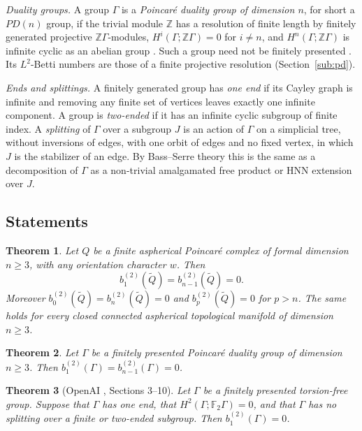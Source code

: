 \documentclass[11pt,a4paper]{article}
\newtheorem{theoremx}{Theorem}
\theoremstyle{definition}
\theoremstyle{remark}
\newcommand{\Z}{\mathbb{Z}}
\newcommand{\F}{\mathbb{F}}
\newcommand{\Gam}{\Gamma}
\newcommand{\bt}[1]{b^{(2)}_{#1}}
\begin{document}
\emph{Duality groups.} A group $\Gam$ is a \emph{Poincar\'e duality group of dimension
$n$}, for short a $PD(n)$ group, if the trivial module $\Z$ has a resolution of
finite length by finitely generated projective $\Z\Gam$-modules, $H^i(\Gam;\Z\Gam)=0$ for
$i\ne n$, and $H^n(\Gam;\Z\Gam)$ is infinite cyclic as an abelian group \cite{Da}. Such
a group need not be finitely presented \cite[Theorem~7.15]{Da}. Its $L^2$-Betti
numbers are those of a finite projective resolution (Section~\ref{sub:pd}).

\emph{Ends and splittings.} A finitely generated group has \emph{one end} if its
Cayley graph is infinite and removing any finite set of vertices leaves exactly one
infinite component. A group is \emph{two-ended} if it has an infinite cyclic
subgroup of finite index. A \emph{splitting} of $\Gam$ over a subgroup $J$ is an
action of $\Gam$ on a simplicial tree, without inversions of edges, with one orbit of
edges and no fixed vertex, in which $J$ is the stabilizer of an edge. By Bass--Serre
theory this is the same as a decomposition of $\Gam$ as a non-trivial amalgamated free
product or HNN extension over $J$.

\subsection{Statements}

\begin{theoremx}\label{thm:A}
Let $Q$ be a finite aspherical Poincar\'e complex of formal dimension $n\ge3$,
with any orientation character $w$. Then
\[
 \bt{1}(\widetilde Q)=\bt{n-1}(\widetilde Q)=0 .
\]
Moreover $\bt{0}(\widetilde Q)=\bt{n}(\widetilde Q)=0$ and $\bt{p}(\widetilde Q)=0$
for $p>n$. The same holds for every closed connected aspherical topological
manifold of dimension $n\ge3$.
\end{theoremx}

\begin{theoremx}\label{thm:B}
Let $\Gam$ be a finitely presented Poincar\'e duality group of dimension $n\ge3$.
Then $\bt{1}(\Gam)=\bt{n-1}(\Gam)=0$.
\end{theoremx}

\begin{theoremx}[OpenAI \cite{O}, Sections 3--10]\label{thm:C}
Let $\Gam$ be a finitely presented torsion-free group. Suppose that $\Gam$ has one
end, that $H^2(\Gam;\F_2\Gam)=0$, and that $\Gam$ has no splitting over a finite or
two-ended subgroup. Then $\bt{1}(\Gam)=0$.
\end{theoremx}
\end{document}
